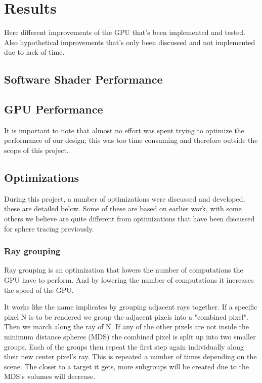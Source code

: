 \chapter{Results}

	Here different improvements of the GPU that's been implemented and tested.
	Also hypothetical improvements that's only been discussed and not
	implemented due to lack of time.  

	\section{Software Shader Performance}

	\section{GPU Performance}
		
		It is important to note that almost no effort was spent trying to
		optimize the performance of our design; this was too time consuming and
		therefore outside the scope of this project.

	\section{Optimizations}
		
		During this project, a number of optimizations were discussed and 
		developed, these are detailed below. Some of these are based on earlier
		work, with some others we believe are quite different from optimizations
		that have been discussed for sphere tracing previously.

		\subsection{Ray grouping}
		
			Ray grouping is an optimization that lowers the number of
			computations the GPU have to perform. And by lowering the number of
			computations it increases the speed of the GPU.
			
			It works like the name implicates by grouping adjacent rays
			together.  If a specific pixel N is to be rendered we group the
			adjacent pixels into a "combined pixel". Then we march along the
			ray of N. If any of the other pixels are not inside the minimum
			distance spheres (MDS) the combined pixel is split up into two
			smaller groups. Each of the groups then repeat the first step again
			individually along their new center pixel's ray. This is repeated a
			number of times depending on the scene.  The closer to a target it
			gets, more subgroups will be created due to the MDS's volumes will
			decrease.
			
